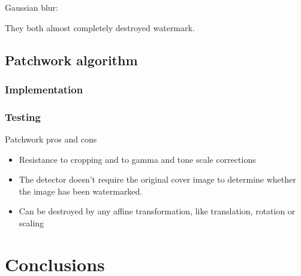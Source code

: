 \documentclass[a4paper, 12pt]{article}
\begin{document}
		Gaussian blur:

 		\begin{figure}[!h]%
			\centering
			\qquad
			\label{}%
		\end{figure}


   	They both almost completely destroyed watermark.

	\subsection{Patchwork algorithm}
	
	\subsubsection{Implementation}
	
	
	
	\subsubsection{Testing}

	Patchwork pros and cons

	\begin{itemize}
		\item Resistance to cropping and to gamma and tone scale corrections
		\item The detector doesn’t require the original cover image to determine whether the image has been watermarked.
		\item Can be destroyed by any affine transformation, like translation, rotation or scaling
	\end{itemize}

\section{Conclusions}
\end{document}
